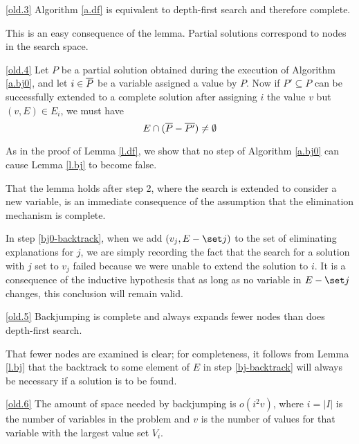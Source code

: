 \begin{oldproposition}{\ref{old.3}} Algorithm \ref{a.df} is equivalent
to depth-first search and therefore complete.
 \end{oldproposition}

\proof This is an easy consequence of the lemma.  Partial solutions
correspond to nodes in the search space.\proofend

\begin{oldlemma}{\ref{old.4}} Let $P$ be a partial solution obtained
during the execution of Algorithm \ref{a.bj0}, and let $i\in\overline P$ be
a variable assigned a value by $P$.  Now if $P'\subseteq P$ can be
successfully extended to a complete solution after assigning $i$ the
value $v$ but $(v,E)\in E_i$, we must have
 \[E\cap(\overline P - \overline{P'}) \neq\emptyset\]
 \end{oldlemma}

\proof As in the proof of Lemma \ref{l.df}, we show that no step of
Algorithm \ref{a.bj0} can cause Lemma \ref{l.bj} to become false.

That the lemma holds after step 2, where the search is extended to
consider a new variable, is an immediate consequence of the assumption
that the elimination mechanism is complete.

In step \ref{bj0-backtrack}, when we add $(v_j,E-\set j)$ to the set
of eliminating explanations for $j$, we are simply recording the fact
that the search for a solution with $j$ set to $v_j$ failed because we
were unable to extend the solution to $i$.  It is a consequence of the
inductive hypothesis that as long as no variable in $E-\set j$
changes, this conclusion will remain valid.\proofend

\begin{oldproposition}{\ref{old.5}} Backjumping is complete and always
expands fewer nodes than does depth-first search.
 \end{oldproposition}

\proof That fewer nodes are examined is clear; for completeness, it
follows from Lemma \ref{l.bj} that the backtrack to some element of
$E$ in step \ref{bj-backtrack} will always be necessary if a solution
is to be found.\proofend

\begin{oldproposition}{\ref{old.6}} The amount of space needed by
backjumping is $o(i^2v)$, where $i=|I|$ is the number of variables in
the problem and $v$ is the number of values for that variable with the
largest value set $V_i$.
 \end{oldproposition}

